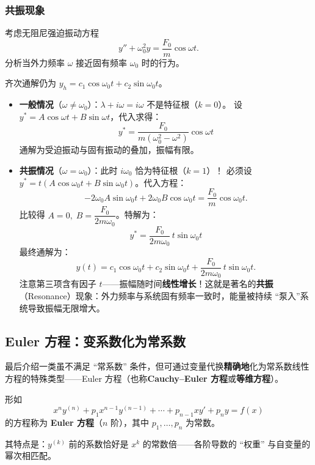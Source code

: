\documentclass[lang=cn,11pt]{elegantbook}
\begin{document}
\subsubsection{共振现象}

\begin{exercise}[共振：无阻尼强迫振动] \label{ex:ode-resonance}
考虑无阻尼强迫振动方程
\[
y''+\omega_0^2 y=\frac{F_0}{m}\cos\omega t.
\]
分析当外力频率 $\omega$ 接近固有频率 $\omega_0$ 时的行为。
\end{exercise}

\begin{solution}
齐次通解仍为 $y_h=c_1\cos\omega_0 t+c_2\sin\omega_0 t$。
\begin{itemize}
\item \textbf{一般情况}（$\omega\neq\omega_0$）：$\lambda+i\omega=i\omega$ 不是特征根（$k=0$）。
设 $y^*=A\cos\omega t+B\sin\omega t$，代入求得：
\[
y^*=\dfrac{F_0}{m(\omega_0^2-\omega^2)}\cos\omega t
\]
通解为受迫振动与固有振动的叠加，振幅有限。

\item \textbf{共振情况}（$\omega=\omega_0$）：此时 $i\omega_0$ 恰为特征根（$k=1$）！
必须设 $y^*=t(A\cos\omega_0 t+B\sin\omega_0 t)$。代入方程：
\[
-2\omega_0 A\sin\omega_0 t+2\omega_0 B\cos\omega_0 t=\frac{F_0}{m}\cos\omega_0 t.
\]
比较得 $A=0,\;B=\dfrac{F_0}{2m\omega_0}$。特解为：
\[
y^*=\dfrac{F_0}{2m\omega_0}\,t\sin\omega_0 t
\]
最终通解为：
\[
\boxed{
y(t)=c_1\cos\omega_0 t+c_2\sin\omega_0 t
      +\frac{F_0}{2m\omega_0}\,t\sin\omega_0 t.
}
\]
注意第三项含有因子 $t$——振幅随时间\textbf{线性增长}！这就是著名的\textbf{共振}（Resonance）现象：外力频率与系统固有频率一致时，能量被持续 ``泵入''系统导致振幅无限增大。
\end{itemize}
\end{solution}


\subsection{Euler 方程：变系数化为常系数}

最后介绍一类虽不满足 ``常系数'' 条件，但可通过变量代换\textbf{精确地}化为常系数线性方程的特殊类型——Euler 方程（也称\textbf{Cauchy--Euler 方程}或\textbf{等维方程}）。

\begin{definition} \label{def:euler-eq}
形如
\[
x^n y^{(n)}+p_1 x^{n-1}y^{(n-1)}+\cdots+p_{n-1}xy'+p_n y=f(x)
\]
的方程称为 \textbf{Euler 方程}（$n$ 阶），其中 $p_1,\dots,p_n$ 为常数。

其特点是：$y^{(k)}$ 前的系数恰好是 $x^k$ 的常数倍——各阶导数的 ``权重''
与自变量的幂次相匹配。
\end{definition}
\end{document}
